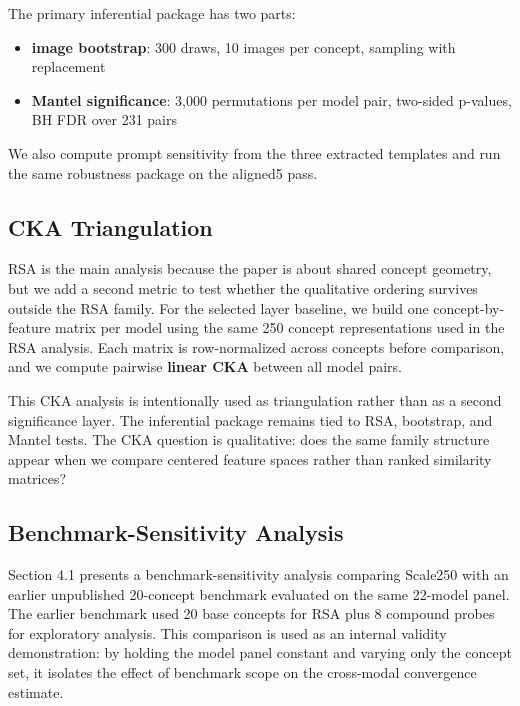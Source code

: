\documentclass[11pt,a4paper]{article}
\providecommand{\tightlist}{%
  \setlength{\itemsep}{0pt}\setlength{\parskip}{0pt}}
\begin{document}
The primary inferential package has two parts:

\begin{itemize}
\tightlist
\item
  \textbf{image bootstrap}: 300 draws, 10 images per concept, sampling
  with replacement
\item
  \textbf{Mantel significance}: 3,000 permutations per model pair,
  two-sided p-values, BH FDR over 231 pairs
\end{itemize}

We also compute prompt sensitivity from the three extracted templates
and run the same robustness package on the aligned5 pass.

\subsection{CKA Triangulation}\label{cka-triangulation}

RSA is the main analysis because the paper is about shared concept
geometry, but we add a second metric to test whether the qualitative
ordering survives outside the RSA family. For the selected layer
baseline, we build one concept-by-feature matrix per model using the
same 250 concept representations used in the RSA analysis. Each matrix
is row-normalized across concepts before comparison, and we compute
pairwise \textbf{linear CKA} between all model pairs.

This CKA analysis is intentionally used as triangulation rather than as
a second significance layer. The inferential package remains tied to
RSA, bootstrap, and Mantel tests. The CKA question is qualitative: does
the same family structure appear when we compare centered feature spaces
rather than ranked similarity matrices?

\subsection{Benchmark-Sensitivity
Analysis}\label{benchmark-sensitivity-analysis}

Section 4.1 presents a benchmark-sensitivity analysis comparing Scale250
with an earlier unpublished 20-concept benchmark evaluated on the same
22-model panel. The earlier benchmark used 20 base concepts for RSA plus
8 compound probes for exploratory analysis. This comparison is used as
an internal validity demonstration: by holding the model panel constant
and varying only the concept set, it isolates the effect of benchmark
scope on the cross-modal convergence estimate.
\end{document}
